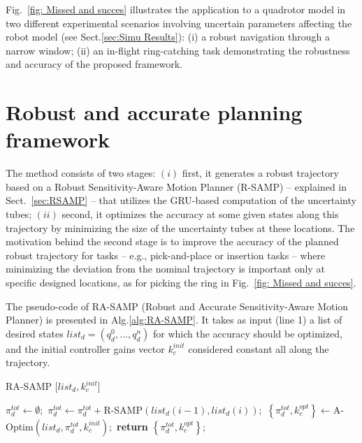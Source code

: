Fig.~\ref{fig: Missed and succes} illustrates the application to a quadrotor model in two different experimental scenarios involving uncertain parameters affecting the robot model (see Sect.\ref{sec:Simu Results}): (i) a robust navigation through a narrow window;
(ii) an in-flight ring-catching task demonstrating the robustness and accuracy of the proposed framework. 


\section{Robust and accurate planning framework}\label{sec:RASAMP}

The method consists of two stages: $(i)$ first, it generates a robust trajectory based on a Robust Sensitivity-Aware Motion Planner (R-SAMP) -- explained in Sect.~\ref{sec:RSAMP} -- that utilizes the GRU-based computation of the uncertainty tubes; $(ii)$ second, it optimizes the accuracy at some given states along this trajectory by minimizing the size of the uncertainty tubes at these locations.
The motivation behind the second stage is to improve the accuracy of the planned robust trajectory for tasks -- e.g., pick-and-place or insertion tasks -- where minimizing the deviation from the nominal trajectory is important only at specific designed locations, as for picking the ring in Fig.~\ref{fig: Missed and succes}.

The pseudo-code of RA-SAMP (Robust and Accurate Sensitivity-Aware Motion Planner) is presented in Alg.\ref{alg:RA-SAMP}. 
It takes as input (line 1) a list of desired states $list_{d} = (q_{d}^0, \dots, q_{d}^n)$ for which the accuracy should be optimized, and the initial controller gains vector $k_{c}^{init}$ considered constant all along the trajectory.

\begin{algorithm}[h]
\caption{RA-SAMP [$list_{d}, k_{c}^{init}$]}\label{alg:RA-SAMP}
\begin{algorithmic}[1]
\State $\pi_d^{tot} \gets \emptyset;$
    \State $\pi_d^{tot} \gets \pi_d^{tot} + $R-SAMP$(list_{d}(i-1),list_{d}(i));$
\EndFor
\State $\left \{ \pi_d^{tot}, k_{c}^{opt} \right \} \gets $A-Optim$(list_{d},\pi_d^{tot}, k_{c}^{init});$
\State \textbf{return} $\left \{ \pi_d^{tot}, k_{c}^{opt}  \right \}$;
\end{algorithmic}
\end{algorithm}

